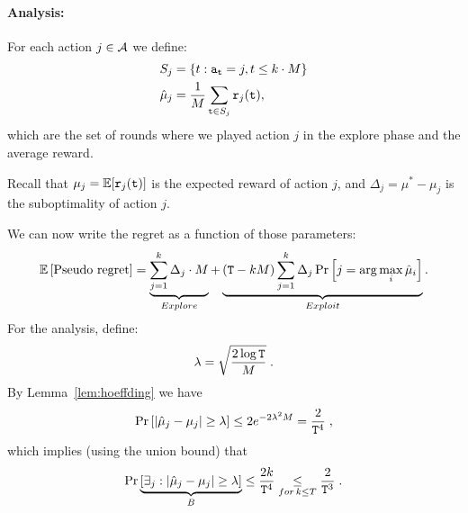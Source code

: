 
\paragraph{Analysis:}
For each action $j\in\mathcal{A}$ we define:
\begin{align*}
S_{j}&= \left\{ t:{\tt a}_{{\tt t}}=j,t\le k\cdot M\right\}\\
\hat{\mu}_{j}&=\frac{1}{M} \sum_{{\tt t}\in S_{j}}{\tt r}_{j}({\tt t}),
\end{align*}
which are the set of rounds where we played action $j$ in the explore phase and the average reward.

Recall that 
$\mu_{j}=\mathbb{E}[{\tt r}_{j}({\tt t})]$ is the expected reward of action $j$, and 
$
\Delta_{j}=\mu^{*}-\mu_{j}$ is the suboptimality of action $j$.

We can now write the regret as a function of those parameters:
\[
\mathbb{E}\left[\text{Pseudo regret}\right]=\underbrace{
\sum_{j=1}^{k}\Delta_{j}\cdot
M}_{Explore}+\underbrace{\left({\tt T}-k M\right)
\sum_{j=1}^{k}\Delta_{j}\Pr\left[j=\arg\max_{i}\hat{\mu}_{i}\right]}_{Exploit}.
\]
For the analysis, define:
\[
\lambda=\sqrt{\frac{2\log {\tt T}}{M}}\;.
\]
By Lemma~\ref{lem:hoeffding} we have
\[
\Pr\left[\left|\hat{\mu}_{j}-\mu_{j}\right|\ge\lambda\right]  \le
2e^{-2\lambda^2 M}=\frac{2}{{\tt T}^{4}}\;,
\]
which implies (using the union bound) that
\[
\Pr\underbrace{\left[\exists_{j}:\left|\hat{\mu}_{j}-\mu_{j}\right|\ge\lambda\right]}_{B}
 \le  \frac{2k}{{\tt T}^{4}}\underset{for\,k\leq T}{\leq}\frac{2}{{\tt T}^{3}}\;.
\]

